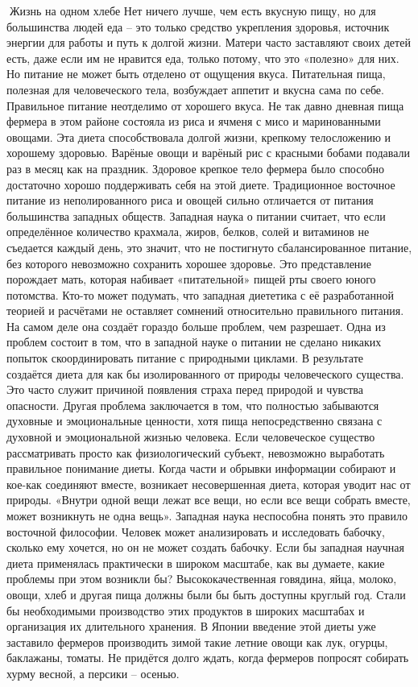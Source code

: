 \documentclass[a4paper]{book}
\begin{document}
Жизнь на одном хлебе
Нет ничего лучше, чем есть вкусную пищу, но для большинства людей еда – это только
средство укрепления здоровья, источник энергии для работы и путь к долгой жизни. Матери
часто заставляют своих детей есть, даже если им не нравится еда, только потому, что это
«полезно» для них.
Но питание не может быть отделено от ощущения вкуса. Питательная пища, полезная
для человеческого тела, возбуждает аппетит и вкусна сама по себе. Правильное питание
неотделимо от хорошего вкуса.
Не так давно дневная пища фермера в этом районе состояла из риса и ячменя с мисо и
маринованными овощами. Эта диета способствовала долгой жизни, крепкому телосложению
и хорошему здоровью. Варёные овощи и варёный рис с красными бобами подавали раз в
месяц как на праздник. Здоровое крепкое тело фермера было способно достаточно хорошо
поддерживать себя на этой диете.
Традиционное восточное питание из неполированного риса и овощей сильно отличается
от питания большинства западных обществ. Западная наука о питании считает, что если
определённое количество крахмала, жиров, белков, солей и витаминов не съедается каждый
день, это значит, что не постигнуто сбалансированное питание, без которого невозможно
сохранить хорошее здоровье. Это представление порождает мать, которая набивает
«питательной» пищей рты своего юного потомства.
Кто-то может подумать, что западная диететика с её разработанной теорией и
расчётами не оставляет сомнений относительно правильного питания. На самом деле она
создаёт гораздо больше проблем, чем разрешает. Одна из проблем состоит в том, что в
западной науке о питании не сделано никаких попыток скоординировать питание с
природными циклами. В результате создаётся диета для как бы изолированного от природы
человеческого существа. Это часто служит причиной появления страха перед природой и
чувства опасности.
Другая проблема заключается в том, что полностью забываются духовные и
эмоциональные ценности, хотя пища непосредственно связана с духовной и эмоциональной
жизнью человека. Если человеческое существо рассматривать просто как физиологический
субъект, невозможно выработать правильное понимание диеты. Когда части и обрывки
информации собирают и кое-как соединяют вместе, возникает несовершенная диета,
которая уводит нас от природы.
«Внутри одной вещи лежат все вещи, но если все вещи собрать вместе, может
возникнуть не одна вещь». Западная наука неспособна понять это правило восточной
философии. Человек может анализировать и исследовать бабочку, сколько ему хочется, но он
не может создать бабочку.
Если бы западная научная диета применялась практически в широком масштабе, как вы
думаете, какие проблемы при этом возникли бы? Высококачественная говядина, яйца,
молоко, овощи, хлеб и другая пища должны были бы быть доступны круглый год. Стали бы
необходимыми производство этих продуктов в широких масштабах и организация их
длительного хранения. В Японии введение этой диеты уже заставило фермеров производить
зимой такие летние овощи как лук, огурцы, баклажаны, томаты. Не придётся долго ждать,
когда фермеров попросят собирать хурму весной, а персики – осенью.
\end{document}
